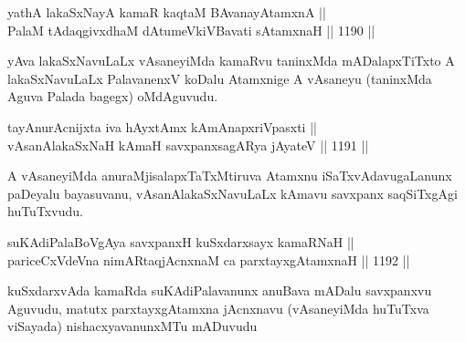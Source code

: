 
\begin{shl}
\footnotemark[2]yathA lakaSxNayA kamaR kaqtaM BAvanayA\s \s tamxnA || \\
PalaM tAdaqgivxdhaM dAtumeVkiVBavati sA\s \s tamxnaH ||  1190 ||  
\end{shl}

\begin{artha}
yAva lakaSxNavuLaLx vAsaneyiMda kamaRvu taninxMda mADalapxTiTxto A lakaSxNavuLaLx PalavanenxV koDalu Atamxnige A vAsaneyu (taninxMda Aguva Palada bagegx) oMdAguvudu.
\end{artha}

\begin{shl}
\footnotemark[3]tayA\s nurAcnijxta iva hAyxtAmx kAmAnapxriVpasxti || \\
vAsanAlakaSxNaH kAmaH savxpanxsagARya jAyateV ||  1191 || 
\end{shl}

\begin{artha}
A vAsaneyiMda anuraMjisalapxTaTxMtiruva Atamxnu iSaTxvAdavugaLanunx paDeyalu bayasuvanu, vAsanAlakaSxNavuLaLx kAmavu savxpanx saqSiTxgAgi huTuTxvudu.
\end{artha}


\begin{shl}
\footnotemark[4]suKAdiPalaBoVgAya savxpanxH kuSxdarxsayx kamaRNaH || \\
pariceCxVdeVna nimARtaqjAcnxnaM ca parxtayxgAtamxnaH ||  1192 ||  
\end{shl}

\begin{artha}
kuSxdarxvAda kamaRda suKAdiPalavanunx anuBava mADalu savxpanxvu Aguvudu, matutx parxtayxgAtamxna jAcnxnavu (vAsaneyiMda huTuTxva viSayada) nishacxyavanunxMTu mADuvudu
\end{artha}


